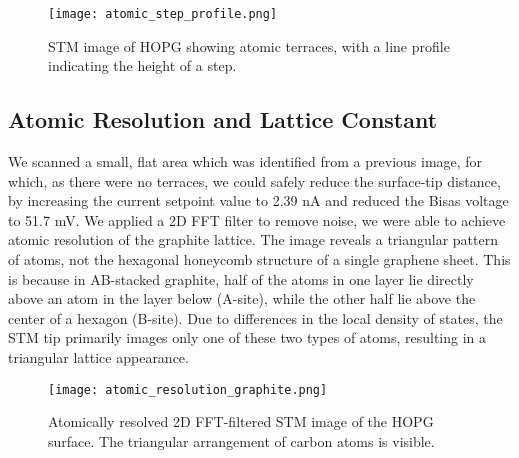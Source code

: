\documentclass[12pt,a4paper]{article}
\begin{document}
\begin{figure}[H]
    \centering
    \texttt{[image: atomic\_step\_profile.png]}
    \caption{STM image of HOPG showing atomic terraces, with a line profile indicating the height of a step.}
    \label{fig:step}
\end{figure}


\subsection{Atomic Resolution and Lattice Constant}
We scanned a small, flat area which was identified from a previous image, for which, as there were no terraces, we could safely reduce the surface-tip distance, by increasing the current setpoint value to 2.39 nA and reduced the Bisas voltage to 51.7 mV. We applied a 2D FFT filter to remove noise, we were able to achieve atomic resolution of the graphite lattice. The image reveals a triangular pattern of atoms, not the hexagonal honeycomb structure of a single graphene sheet. This is because in AB-stacked graphite, half of the atoms in one layer lie directly above an atom in the layer below (A-site), while the other half lie above the center of a hexagon (B-site). Due to differences in the local density of states, the STM tip primarily images only one of these two types of atoms, resulting in a triangular lattice appearance.

\begin{figure}[H]
    \centering
    \texttt{[image: atomic\_resolution\_graphite.png]}
    \caption{Atomically resolved 2D FFT-filtered STM image of the HOPG surface. The triangular arrangement of carbon atoms is visible.}
    \label{fig:atomic-res}
\end{figure}

\end{document}
